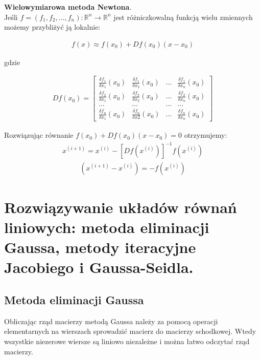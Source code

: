 \documentclass[12pt]{article}
\begin{document}
    \textbf{Wielowymiarowa metoda Newtona}.\\

    Jeśli $f = (f_1, f_2, \dots, f_n): \mathbb{R}^n \rightarrow \mathbb{R}^n$ jest różniczkowalną funkcją wielu zmiennych
    możemy przybliżyć ją lokalnie:

    \begin{align*}
        f(x) \approx f(x_0) + Df(x_0)(x - x_0)
    \end{align*}

    gdzie

    \begin{align*}
        Df(x_0) =
        \begin{bmatrix}
            \frac{\delta f_1}{\delta x_1}(x_0) & \frac{\delta f_1}{\delta x_2}(x_0) & \dots & \frac{\delta f_1}{\delta x_n}(x_0)\\
            \frac{\delta f_2}{\delta x_1}(x_0) & \frac{\delta f_2}{\delta x_2}(x_0) & \dots & \frac{\delta f_2}{\delta x_n}(x_0)\\
            \dots & \dots & \dots & \dots\\
            \frac{\delta f_n}{\delta x_1}(x_0) & \frac{\delta f_n}{\delta x2}(x_0) & \dots & \frac{\delta f_n}{\delta x_n}(x_0)
        \end{bmatrix}
    \end{align*}

    Rozwiązując równanie $f(x_0) + Df(x_0)(x - x_0) = 0$ otrzymujemy:
    \begin{align*}
        x^{(i+1)} = x^{(i)} - [Df(x^{(i)})]^{-1} f(x^{(i)})
    \end{align*}
    \begin{align*}
    [Df(x^{(i)})]
        ( x^{(i+1)} - x^{(i)} ) = -f(x^{(i)})
    \end{align*}

    \newpage

    \section{Rozwiązywanie układów równań liniowych: metoda eliminacji Gaussa, metody iteracyjne Jacobiego i Gaussa-Seidla.}

    \subsection{Metoda eliminacji Gaussa}

    Obliczając rząd macierzy metodą Gaussa należy za pomocą operacji elementarnych na wierszach sprowadzić macierz do
    macierzy schodkowej. Wtedy wszystkie niezerowe wiersze są liniowo niezależne i można łatwo odczytać rząd macierzy.
\end{document}
